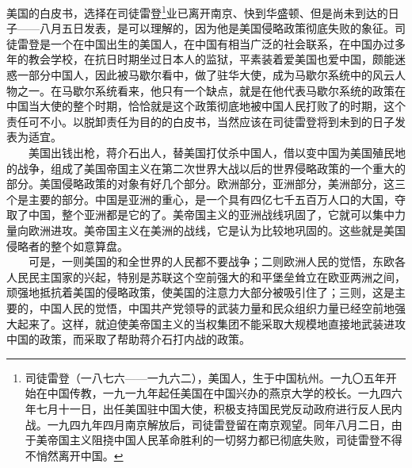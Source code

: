 \documentclass[cn,11pt,chinese]{elegantbook}
\begin{document}
美国的白皮书，选择在司徒雷登\footnote[1]{ 司徒雷登（一八七六——一九六二），美国人，生于中国杭州。一九〇五年开始在中国传教，一九一九年起任美国在中国兴办的燕京大学的校长。一九四六年七月十一日，出任美国驻中国大使，积极支持国民党反动政府进行反人民内战。一九四九年四月南京解放后，司徒雷登留在南京观望。同年八月二日，由于美帝国主义阻挠中国人民革命胜利的一切努力都已彻底失败，司徒雷登不得不悄然离开中国。}业已离开南京、快到华盛顿、但是尚未到达的日子——八月五日发表，是可以理解的，因为他是美国侵略政策彻底失败的象征。司徒雷登是一个在中国出生的美国人，在中国有相当广泛的社会联系，在中国办过多年的教会学校，在抗日时期坐过日本人的监狱，平素装着爱美国也爱中国，颇能迷惑一部分中国人，因此被马歇尔看中，做了驻华大使，成为马歇尔系统中的风云人物之一。在马歇尔系统看来，他只有一个缺点，就是在他代表马歇尔系统的政策在中国当大使的整个时期，恰恰就是这个政策彻底地被中国人民打败了的时期，这个责任可不小。以脱卸责任为目的的白皮书，当然应该在司徒雷登将到未到的日子发表为适宜。\\
　　美国出钱出枪，蒋介石出人，替美国打仗杀中国人，借以变中国为美国殖民地的战争，组成了美国帝国主义在第二次世界大战以后的世界侵略政策的一个重大的部分。美国侵略政策的对象有好几个部分。欧洲部分，亚洲部分，美洲部分，这三个是主要的部分。中国是亚洲的重心，是一个具有四亿七千五百万人口的大国，夺取了中国，整个亚洲都是它的了。美帝国主义的亚洲战线巩固了，它就可以集中力量向欧洲进攻。美帝国主义在美洲的战线，它是认为比较地巩固的。这些就是美国侵略者的整个如意算盘。\\
　　可是，一则美国的和全世界的人民都不要战争；二则欧洲人民的觉悟，东欧各人民民主国家的兴起，特别是苏联这个空前强大的和平堡垒耸立在欧亚两洲之间，顽强地抵抗着美国的侵略政策，使美国的注意力大部分被吸引住了；三则，这是主要的，中国人民的觉悟，中国共产党领导的武装力量和民众组织力量已经空前地强大起来了。这样，就迫使美帝国主义的当权集团不能采取大规模地直接地武装进攻中国的政策，而采取了帮助蒋介石打内战的政策。\\
\end{document}
